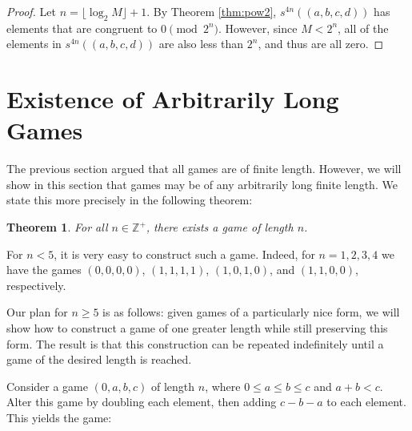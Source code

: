 \documentclass[12pt]{amsart}
\newtheorem{theorem}{Theorem}[section]
\newtheorem{lemma}[theorem]{Lemma}
\newcommand{\diff}{s}
\newcommand{\zp}{\mathbb{Z}^+}
\begin{document}
\begin{proof}
Let $n = \lfloor\log_2{M}\rfloor + 1$. By Theorem \ref {thm:pow2}, $\diff^{4n}((a, b, c, d))$ has elements that are congruent to $0\pmod{2^n}$. However, since $M < 2^n$, all of the elements in $\diff^{4n}((a, b, c, d))$ are also less than $2^n$, and thus are all zero.
\end{proof}

\section{Existence of Arbitrarily Long Games\label{sec:longgames}}

The previous section argued that all games are of finite length. However, we will show in this section that games may be of any arbitrarily long finite length. We state this more precisely in the following theorem:

\begin{theorem}
For all $n\in \zp$, there exists a game of length $n$.
\end{theorem}

For $n < 5$, it is very easy to construct such a game. Indeed, for $n=1,2,3,4$ we have the games $(0, 0, 0, 0)$, $(1, 1, 1, 1)$, $(1, 0, 1, 0)$, and $(1, 1, 0, 0)$, respectively.

Our plan for $n \geq 5$ is as follows: given games of a particularly nice form, we will show how to construct a game of one greater length while still preserving this form. The result is that this construction can be repeated indefinitely until a game of the desired length is reached.



Consider a game $(0, a, b, c)$ of length $n$, where $0\leq a\leq b\leq c$ and $a + b < c$. Alter this game by doubling each element, then adding $c - b - a$ to each element. This yields the game:
\end{document}
